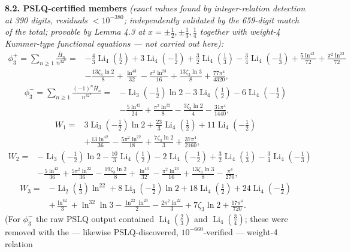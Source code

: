 \documentclass[11pt]{article}
\theoremstyle{remark}
\begin{document}
\textbf{8.2. PSLQ-certified members} \textit{(exact values found by integer-relation detection at 390 digits, residuals $<10^{-380}$; independently validated by the 659-digit match of the total; provable by Lemma 4.3 at $x=\pm\tfrac12,\pm\tfrac13,\tfrac14$ together with weight-4 Kummer-type functional equations --- not carried out here):}
\[
\begin{aligned}
\phi_3^{+}=\sum_{n\ge1}\frac{\overline H_n}{n^32^n}={}&-\frac43\operatorname{Li}_4(\tfrac12)+3\operatorname{Li}_4(-\tfrac12)+\frac32\operatorname{Li}_4(\tfrac13)-\frac34\operatorname{Li}_4(-\tfrac13)
+\frac{5\ln^42}{72}+\frac{\pi^2\ln^22}{72}\\
&-\frac{13\zeta_3\ln2}{8}+\frac{\ln^43}{32}-\frac{\pi^2\ln^23}{16}+\frac{13\zeta_3\ln3}{8}+\frac{77\pi^4}{4320},
\end{aligned}
\]
\[
\begin{aligned}
\phi_3^{-}=\sum_{n\ge1}\frac{(-1)^n\overline H_n}{n^32^n}={}&-\operatorname{Li}_3(-\tfrac12)\ln2-3\operatorname{Li}_4(\tfrac12)-6\operatorname{Li}_4(-\tfrac12)\\
&-\frac{5\ln^42}{24}+\frac{\pi^2\ln^22}{8}-\frac{3\zeta_3\ln2}{4}-\frac{31\pi^4}{1440},
\end{aligned}
\]
\[
\begin{aligned}
W_1={}&3\operatorname{Li}_3(-\tfrac12)\ln2+\frac{23}3\operatorname{Li}_4(\tfrac12)+11\operatorname{Li}_4(-\tfrac12)\\
&+\frac{13\ln^42}{36}-\frac{5\pi^2\ln^22}{18}+\frac{7\zeta_3\ln2}{3}+\frac{37\pi^4}{2160},
\end{aligned}
\]
\[
\begin{aligned}
W_2={}&-\operatorname{Li}_3(-\tfrac12)\ln2-\frac{10}3\operatorname{Li}_4(\tfrac12)-2\operatorname{Li}_4(-\tfrac12)+\frac32\operatorname{Li}_4(\tfrac13)-\frac34\operatorname{Li}_4(-\tfrac13)\\
&-\frac{5\ln^42}{36}+\frac{5\pi^2\ln^22}{36}-\frac{19\zeta_3\ln2}{8}+\frac{\ln^43}{32}-\frac{\pi^2\ln^23}{16}+\frac{13\zeta_3\ln3}{8}-\frac{\pi^4}{270},
\end{aligned}
\]
\[
\begin{aligned}
W_3={}&-\operatorname{Li}_2(\tfrac13)\ln^22+8\operatorname{Li}_3(-\tfrac12)\ln2+18\operatorname{Li}_4(\tfrac12)+24\operatorname{Li}_4(-\tfrac12)\\
&+\frac{\ln^42}{3}+\ln^32\ln3-\frac{\ln^22\ln^23}{2}-\frac{2\pi^2\ln^22}{3}+7\zeta_3\ln2+\frac{17\pi^4}{720}.
\end{aligned}
\]
(For $\phi_3^-$ the raw PSLQ output contained $\operatorname{Li}_4(\tfrac23)$ and $\operatorname{Li}_4(\tfrac34)$; these were removed with the --- likewise PSLQ-discovered, $10^{-660}$-verified --- weight-4 relation
\end{document}
